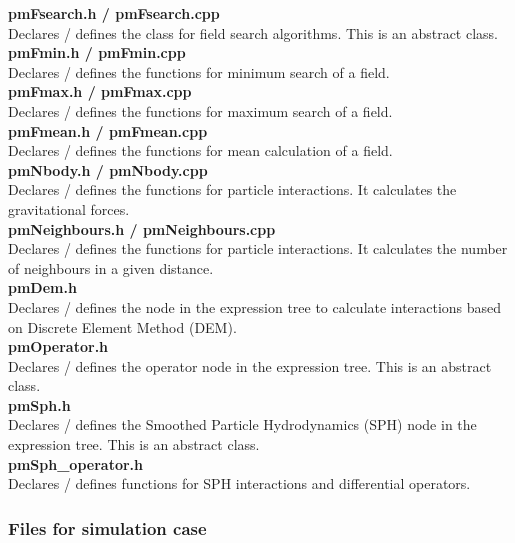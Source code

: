 \documentclass[a4paper,12pt,openany]{book}
\theoremstyle{break}
\begin{document}
\textbf{pmFsearch.h / pmFsearch.cpp} \\
Declares / defines the class for field search algorithms. This is an abstract class. \\

\textbf{pmFmin.h / pmFmin.cpp} \\
Declares / defines the functions for minimum search of a field.  \\

\textbf{pmFmax.h / pmFmax.cpp} \\
Declares / defines the functions for maximum search of a field. \\

\textbf{pmFmean.h / pmFmean.cpp} \\
Declares / defines the functions for mean calculation of a field. \\

\textbf{pmNbody.h / pmNbody.cpp} \\
Declares / defines the functions for particle interactions. It calculates the gravitational forces. \\

\textbf{pmNeighbours.h / pmNeighbours.cpp} \\
Declares / defines the functions for particle interactions. It calculates the number of neighbours in a given distance. \\

\textbf{pmDem.h} \\
Declares / defines the node in the expression tree to calculate interactions based on Discrete Element Method (DEM). \\

\textbf{pmOperator.h} \\
Declares / defines the operator node in the expression tree. This is an abstract class. \\

\textbf{pmSph.h} \\
Declares / defines the Smoothed Particle Hydrodynamics (SPH) node in the expression tree. This is an abstract class. \\

\textbf{pmSph\_operator.h} \\
Declares / defines functions for SPH interactions and differential operators. \\

\subsubsection{Files for simulation case}
\end{document}
